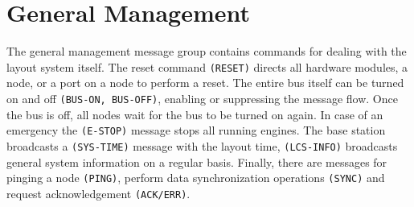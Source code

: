 \section{General Management}

The general management message group contains commands for dealing with the layout system itself. The reset command \texttt{(RESET)} directs all hardware modules, a node, or a port on a node to perform a reset. The entire bus itself can be turned on and off \texttt{(BUS-ON, BUS-OFF)}, enabling or suppressing the message flow. Once the bus is off, all nodes wait for the bus to be turned on again. In case of an emergency the \texttt{(E-STOP)} message stops all running engines. The base station broadcasts a \texttt{(SYS-TIME)} message with the layout time, \texttt{(LCS-INFO)} broadcasts general system information on a regular basis. Finally, there are messages for pinging a node \texttt{(PING)}, perform data synchronization operations \texttt{(SYNC)} and request acknowledgement \texttt{(ACK/ERR)}.

\begin{table}[ht!]
    \centering 
    \caption{General Management}
\end{table}

